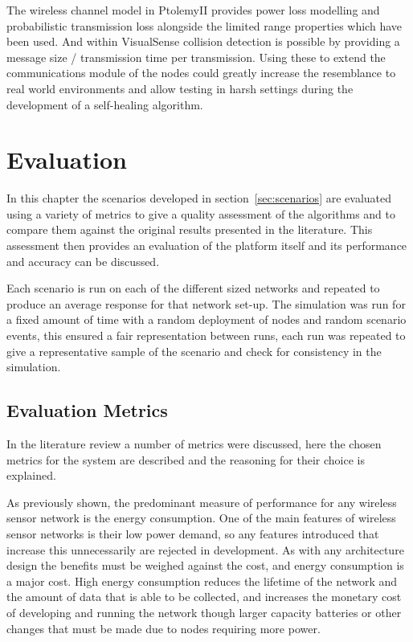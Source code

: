 \documentclass[authoryearcitations]{UoYCSproject}
\begin{document}
The wireless channel model in PtolemyII provides power loss modelling and probabilistic transmission loss alongside the limited range properties which have been used. And within VisualSense collision detection is possible by providing a message size / transmission time per transmission. Using these to extend the communications module of the nodes could greatly increase the resemblance to real world environments and allow testing in harsh settings during the development of a self-healing algorithm.

\chapter{Evaluation}
\label{cha:Eval}

In this chapter the scenarios developed in section~\ref{sec:scenarios} are evaluated using a variety of metrics to give a quality assessment of the algorithms and to compare them against the original results presented in the literature. This assessment then provides an evaluation of the platform itself and its performance and accuracy can be discussed.

Each scenario is run on each of the different sized networks and repeated to produce an average response for that network set-up. The simulation was run for a fixed amount of time with a random deployment of nodes and random scenario events, this ensured a fair representation between runs, each run was repeated to give a representative sample of the scenario and check for consistency in the simulation.

\section{Evaluation Metrics}

In the literature review a number of metrics were discussed, here the chosen metrics for the system are described and the reasoning for their choice is explained.

As previously shown, the predominant measure of performance for any wireless sensor network is the energy consumption. One of the main features of wireless sensor networks is their low power demand, so any features introduced that increase this unnecessarily are rejected in development. As with any architecture design the benefits must be weighed against the cost, and energy consumption is a major cost. High energy consumption reduces the lifetime of the network and the amount of data that is able to be collected, and increases the monetary cost of developing and running the network though larger capacity batteries or other changes that must be made due to nodes requiring more power.
\end{document}
